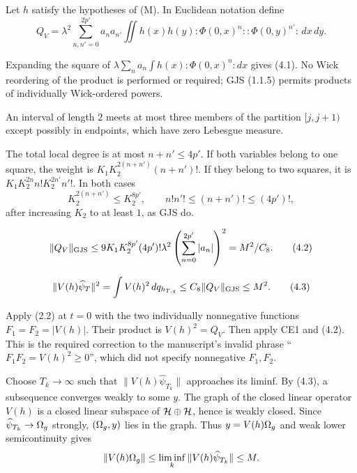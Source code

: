 \documentclass[11pt,a4paper]{article}
\begin{document}
Let $h$ satisfy the hypotheses of (M).  In Euclidean notation define
\[
 Q_V=\lambda^2\sum_{n,n'=0}^{2p'}a_na_{n'}
 \iint h(x)h(y){:}\Phi(0,x)^n{:}{:}\Phi(0,y)^{n'}{:}\,dx\,dy.       \tag{4.1}
\]


\Because Expanding the square of
$\lambda\sum_na_n\int h(x){:}\Phi(0,x)^n{:}dx$ gives (4.1).  No Wick
reordering of the product is performed or required; GJS (1.1.5) permits products
of individually Wick-ordered powers.


\Because An interval of length $2$ meets at most three members of the partition
$[j,j+1)$ except possibly in endpoints, which have zero Lebesgue measure.


\Because The total local degree is at most $n+n'\leq4p'$.  If both variables
belong to one square, the weight is
$K_1K_2^{2(n+n')}(n+n')!$.  If they belong to two squares, it is
$K_1K_2^{2n}n!K_2^{2n'}n'!$.  In both cases
\[
 K_2^{2(n+n')}\leq K_2^{8p'},\qquad n!n'!\leq(n+n')!\leq(4p')!,
\]
after increasing $K_2$ to at least $1$, as GJS do.

\[
 \|Q_V\|_{\rm GJS}\leq
 9K_1K_2^{8p'}(4p')!\lambda^2
 \left(\sum_{n=0}^{2p'}|a_n|\right)^2=M^2/C_8.                     \tag{4.2}
\]

\[
 \|V(h)\widehat\psi_T\|^2
 =\int V(h)^2\,dq_{h_{T,g}}\leq C_8\|Q_V\|_{\rm GJS}\leq M^2.     \tag{4.3}
\]

\Because Apply (2.2) at $t=0$ with the two individually nonnegative functions
$F_1=F_2=|V(h)|$.  Their product is $V(h)^2=Q_V$.  Then apply CE1 and (4.2).
This is the required correction to the manuscript's invalid phrase
``$F_1F_2=V(h)^2\geq0$'', which did not specify nonnegative $F_1,F_2$.


\Because Choose $T_k\to\infty$ such that
$\|V(h)\widehat\psi_{T_k}\|$ approaches its liminf.  By (4.3), a subsequence
converges weakly to some $y$.  The graph of the closed linear operator $V(h)$ is a
closed linear subspace of $\mathcal H\oplus\mathcal H$, hence is weakly closed.  Since
$\widehat\psi_{T_k}\to\Omega_g$ strongly, $(\Omega_g,y)$ lies in the graph.  Thus
$y=V(h)\Omega_g$ and weak lower semicontinuity gives
\[
 \|V(h)\Omega_g\|\leq\liminf_k\|V(h)\widehat\psi_{T_k}\|\leq M.
\]
\end{document}
